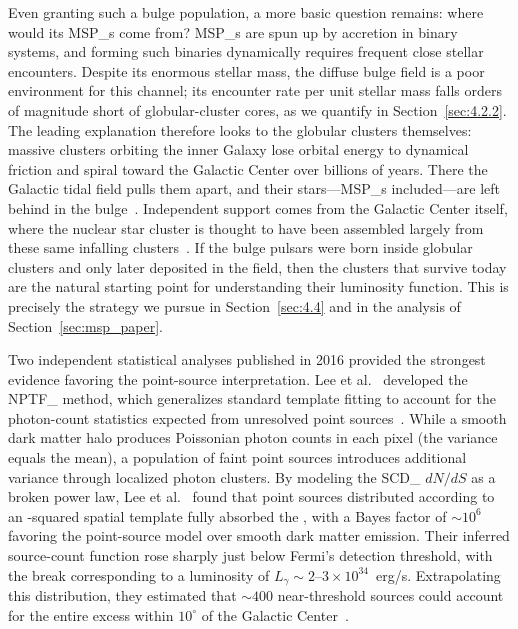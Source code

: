 Even granting such a bulge population, a more basic question remains: where would its \glspl{MSP_} come from?
\Glspl{MSP_} are spun up by accretion in binary systems, and forming such binaries dynamically requires frequent close stellar encounters.
Despite its enormous stellar mass, the diffuse bulge field is a poor environment for this channel; its encounter rate per unit stellar mass falls orders of magnitude short of globular-cluster cores, as we quantify in Section~\ref{sec:4.2.2}.
The leading explanation therefore looks to the globular clusters themselves: massive clusters orbiting the inner Galaxy lose orbital energy to dynamical friction and spiral toward the Galactic Center over billions of years.
There the Galactic tidal field pulls them apart, and their stars---\glspl{MSP_} included---are left behind in the bulge~\cite{Gnedin:2013cda,Brandt:2015ula,Fragione:2017rsp}.
Independent support comes from the Galactic Center itself, where the nuclear star cluster is thought to have been assembled largely from these same infalling clusters~\cite{Gnedin:2013cda}.
If the bulge pulsars were born inside globular clusters and only later deposited in the field, then the clusters that survive today are the natural starting point for understanding their luminosity function.
This is precisely the strategy we pursue in Section~\ref{sec:4.4} and in the analysis of Section~\ref{sec:msp_paper}.

Two independent statistical analyses published in 2016 provided the strongest evidence favoring the point-source interpretation.
Lee et al.
\ developed the \gls{NPTF_} method, which generalizes standard template fitting to account for the photon-count statistics expected from unresolved point sources~\cite{Lee:2015fea}.
While a smooth dark matter halo produces Poissonian photon counts in each pixel (the variance equals the mean), a population of faint point sources introduces additional variance through localized photon clusters.
By modeling the \gls{SCD_} $dN/dS$ as a broken power law, Lee et al.
\ found that point sources distributed according to an \NFW-squared spatial template fully absorbed the \GCE, with a Bayes factor of $\sim 10^6$ favoring the point-source model over smooth dark matter emission.
Their inferred source-count function rose sharply just below Fermi's detection threshold, with the break corresponding to a luminosity of $L_\gamma \sim 2$--$3 \times 10^{34}$~erg/s.
Extrapolating this distribution, they estimated that $\sim 400$ near-threshold sources could account for the entire excess within $10^\circ$ of the Galactic Center~\cite{Lee:2015fea}.

